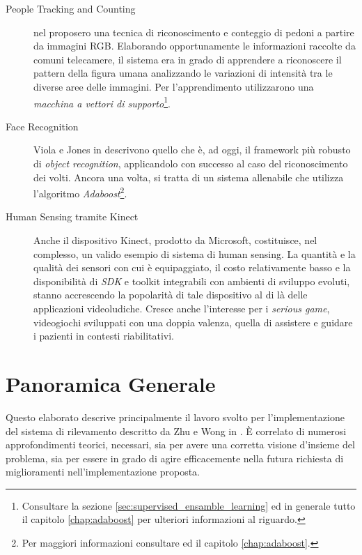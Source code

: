             \begin{description}
                \item[People Tracking and Counting] \citet{Papageorgiou98} nel \citeyear{Papageorgiou98} proposero una tecnica di riconoscimento e conteggio di pedoni a partire da immagini RGB.
                Elaborando opportunamente le informazioni raccolte da comuni telecamere, il sistema era in grado di apprendere a riconoscere il pattern della figura umana analizzando le variazioni di intensità tra le diverse aree delle immagini.
                Per l'apprendimento utilizzarono una \emph{macchina a vettori di supporto}\footnote{Consultare la sezione \ref{sec:supervised_ensamble_learning} ed in generale tutto il capitolo \ref{chap:adaboost} per ulteriori informazioni al riguardo.}.
                
                \item[Face Recognition] Viola e Jones in \cite{Viola04} descrivono quello che è, ad oggi, il framework più robusto di \emph{object recognition}, applicandolo con successo al caso del riconoscimento dei volti.
                Ancora una volta, si tratta di un sistema allenabile che utilizza l'algoritmo \emph{Adaboost}\footnote{Per maggiori informazioni consultare \cite{Freund97} ed il capitolo \ref{chap:adaboost}.}.

                \item[Human Sensing tramite Kinect] Anche il dispositivo Kinect, prodotto da Microsoft, costituisce, nel complesso, un valido esempio di sistema di human sensing.
                La quantità e la qualità dei sensori con cui è equipaggiato, il costo relativamente basso e la disponibilità di \emph{SDK} e toolkit integrabili con ambienti di sviluppo evoluti, stanno accrescendo la popolarità di tale dispositivo al di là delle applicazioni videoludiche.
                Cresce anche l'interesse per i \emph{serious game}, videogiochi sviluppati con una doppia valenza, quella di assistere e guidare i pazienti in contesti riabilitativi.
            \end{description}

    \section{Panoramica Generale}
    \label{sec:overview}
        Questo elaborato descrive principalmente il lavoro svolto per l'implementazione del sistema di rilevamento descritto da Zhu e Wong in \cite{Zhu13}.
        È correlato di numerosi approfondimenti teorici, necessari, sia per avere una corretta visione d'insieme del problema, sia per essere in grado di agire efficacemente nella futura richiesta di miglioramenti nell'implementazione proposta.

